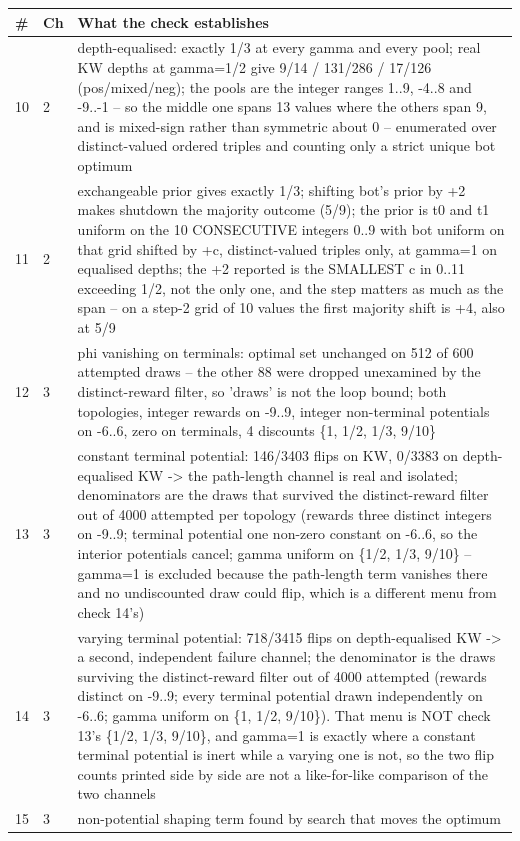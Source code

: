 \begin{tabularx}{\textwidth}{llX}
\toprule
\# & Ch & What the check establishes \\
\midrule
10 & 2 & depth-equalised: exactly 1/3 at every gamma and every pool; real KW depths at gamma=1/2 give 9/14 / 131/286 / 17/126 (pos/mixed/neg); the pools are the integer ranges 1..9, -4..8 and -9..-1 -- so the middle one spans 13 values where the others span 9, and is mixed-sign rather than symmetric about 0 -- enumerated over distinct-valued ordered triples and counting only a strict unique bot optimum \\
11 & 2 & exchangeable prior gives exactly 1/3; shifting bot's prior by +2 makes shutdown the majority outcome (5/9); the prior is t0 and t1 uniform on the 10 CONSECUTIVE integers 0..9 with bot uniform on that grid shifted by +c, distinct-valued triples only, at gamma=1 on equalised depths; the +2 reported is the SMALLEST c in 0..11 exceeding 1/2, not the only one, and the step matters as much as the span -- on a step-2 grid of 10 values the first majority shift is +4, also at 5/9 \\
12 & 3 & phi vanishing on terminals: optimal set unchanged on 512 of 600 attempted draws -- the other 88 were dropped unexamined by the distinct-reward filter, so 'draws' is not the loop bound; both topologies, integer rewards on -9..9, integer non-terminal potentials on -6..6, zero on terminals, 4 discounts \{1, 1/2, 1/3, 9/10\} \\
13 & 3 & constant terminal potential: 146/3403 flips on KW, 0/3383 on depth-equalised KW -> the path-length channel is real and isolated; denominators are the draws that survived the distinct-reward filter out of 4000 attempted per topology (rewards three distinct integers on -9..9; terminal potential one non-zero constant on -6..6, so the interior potentials cancel; gamma uniform on \{1/2, 1/3, 9/10\} -- gamma=1 is excluded because the path-length term vanishes there and no undiscounted draw could flip, which is a different menu from check 14's) \\
14 & 3 & varying terminal potential: 718/3415 flips on depth-equalised KW -> a second, independent failure channel; the denominator is the draws surviving the distinct-reward filter out of 4000 attempted (rewards distinct on -9..9; every terminal potential drawn independently on -6..6; gamma uniform on \{1, 1/2, 9/10\}). That menu is NOT check 13's \{1/2, 1/3, 9/10\}, and gamma=1 is exactly where a constant terminal potential is inert while a varying one is not, so the two flip counts printed side by side are not a like-for-like comparison of the two channels \\
15 & 3 & non-potential shaping term found by search that moves the optimum \\
\bottomrule
\end{tabularx}
